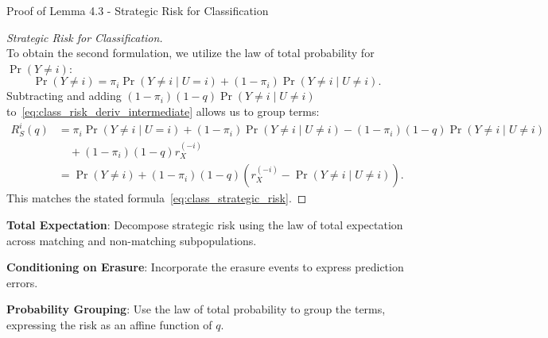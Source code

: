 \begin{sourceblock}{Proof of Lemma 4.3 - Strategic Risk for Classification}
\begin{proof}[Strategic Risk for Classification]
\begin{equation}
\end{equation}
To obtain the second formulation, we utilize the law of total probability for $\Pr(Y \ne i)$:
\begin{equation}
    \Pr(Y \ne i) = \pi_i \Pr(Y \ne i \mid U = i) + (1 - \pi_i)\Pr(Y \ne i \mid U \ne i).
\end{equation}
Subtracting and adding $(1 - \pi_i)(1 - q)\Pr(Y \ne i \mid U \ne i)$ to~\eqref{eq:class_risk_deriv_intermediate} allows us to group terms:
\begin{align}
    R^i_S(q) &= \pi_i \Pr(Y \ne i \mid U = i) + (1 - \pi_i)\Pr(Y \ne i \mid U \ne i) - (1 - \pi_i)(1 - q)\Pr(Y \ne i \mid U \ne i) \nonumber \\
    &\quad + (1 - \pi_i)(1 - q)r^{(-i)}_X \nonumber \\
    &= \Pr(Y \ne i) + (1 - \pi_i)(1 - q)\left( r^{(-i)}_X - \Pr(Y \ne i \mid U \ne i) \right).
\end{align}
This matches the stated formula~\eqref{eq:class_strategic_risk}.
\end{proof}
\end{sourceblock}

\begin{guideblock}
\item \textbf{Total Expectation}: Decompose strategic risk using the law of total expectation across matching and non-matching subpopulations.
\item \textbf{Conditioning on Erasure}: Incorporate the erasure events to express prediction errors.
\item \textbf{Probability Grouping}: Use the law of total probability to group the terms, expressing the risk as an affine function of $q$.
\end{guideblock}


